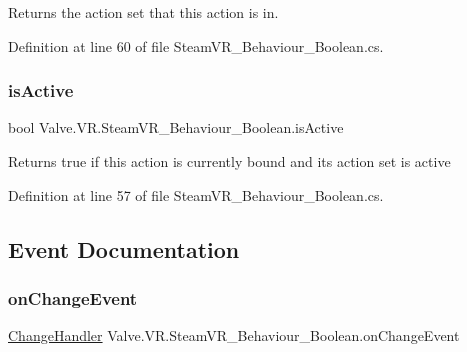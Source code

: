 Returns the action set that this action is in. 



Definition at line 60 of file Steam\+V\+R\+\_\+\+Behaviour\+\_\+\+Boolean.\+cs.

\mbox{\label{class_valve_1_1_v_r_1_1_steam_v_r___behaviour___boolean_a893fb4b744621a730be84d41908e0e3a}} 
\subsubsection{\texorpdfstring{isActive}{isActive}}
{\footnotesize\ttfamily bool Valve.\+V\+R.\+Steam\+V\+R\+\_\+\+Behaviour\+\_\+\+Boolean.\+is\+Active\hspace{0.3cm}{\ttfamily [get]}}



Returns true if this action is currently bound and its action set is active 



Definition at line 57 of file Steam\+V\+R\+\_\+\+Behaviour\+\_\+\+Boolean.\+cs.



\subsection{Event Documentation}
\mbox{\label{class_valve_1_1_v_r_1_1_steam_v_r___behaviour___boolean_a19cd995d03f07a98150ba6c466032af9}} 
\subsubsection{\texorpdfstring{onChangeEvent}{onChangeEvent}}
{\footnotesize\ttfamily \mbox{\hyperlink{class_valve_1_1_v_r_1_1_steam_v_r___behaviour___boolean_ac6747cdeceec4d24ddb39b4de05b1ca6}{Change\+Handler}} Valve.\+V\+R.\+Steam\+V\+R\+\_\+\+Behaviour\+\_\+\+Boolean.\+on\+Change\+Event}



